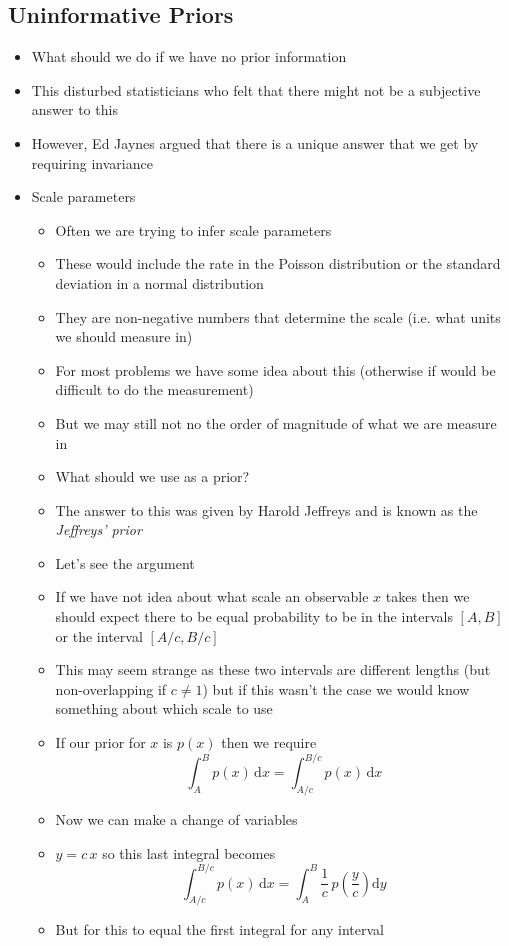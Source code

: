 \documentclass[11pt]{article}
\newcommand{\dd}{\mathrm{d}}
\begin{document}
\subsection{Uninformative Priors}
\label{sec:org88538ba}
\begin{itemize}
\item What should we do if we have no prior information
\item This disturbed statisticians who felt that there might not be a
subjective answer to this
\item However, Ed Jaynes argued that there is a unique answer that we
get by requiring invariance
\item Scale parameters
\begin{itemize}
\item Often we are trying to infer scale parameters
\item These would include the rate in the Poisson distribution or the
standard deviation in a normal distribution
\item They are non-negative numbers that determine the scale
(i.e. what units we should measure in)
\item For most problems we have some idea about this (otherwise if
would be difficult to do the measurement)
\item But we may still not no the order of magnitude of what we are
measure in
\item What should we use as a prior?
\item The answer to this was given by Harold Jeffreys and is known as
the \emph{Jeffreys' prior}
\item Let's see the argument
\item If we have not idea about what scale an observable \(x\) takes
then we should expect there to be equal probability to be in
the intervals \([A,B]\) or the interval \([A/c,B/c]\)
\item This may seem strange as these two intervals are different
lengths (but non-overlapping if \(c\neq1\)) but if this wasn't
the case we would know something about which scale to use
\item If our prior for \(x\) is \(p(x)\) then we require
$$ \int_A^B p(x)\,\dd x = \int_{A/c}^{B/c} p(x)\,\dd x $$
\item Now we can make a change of variables
\item \(y=c\,x\) so this last integral becomes
$$ \int_{A/c}^{B/c} p(x)\,\dd x = \int_A^B \frac{1}{c} \,
       p\!\left(\frac{y}{c}\right) \dd y$$
\item But for this to equal the first integral for any interval

\end{itemize}
\end{itemize}
\end{document}
